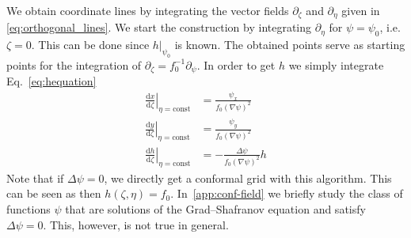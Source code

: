 \documentclass{hitec} %
\renewcommand{\d}{\mathrm{d}}
\begin{document}
We obtain coordinate lines by integrating the vector fields $\partial_\zeta$ and $\partial_\eta$ given in \eqref{eq:orthogonal_lines}. We start the construction by integrating $\partial_\eta$ for $\psi = \psi_0$, i.e. $\zeta=0$. This can be done since $h|_{\psi_0}$ is known. 
The obtained points serve as starting points for the integration of $\partial_\zeta = f_0^{-1} \partial_\psi$.
In order to get $h$ we simply integrate Eq.~\eqref{eq:hequation}
\begin{subequations}
\begin{align}
    \left .\frac{\d x}{\d \zeta}\right |_{\eta=\text{const}} &= \frac{\psi_x}{f_0(\nabla\psi)^2}\\
    \left .\frac{\d y}{\d \zeta}\right|_{\eta=\text{const}} &= \frac{\psi_y}{f_0(\nabla\psi)^2}\\
    \left .\frac{\d h}{\d \zeta}\right|_{\eta=\text{const}} &= - \frac{\Delta \psi}{f_0(\nabla\psi)^2} h%
\end{align}
  \label{eq:etacoordinates}
\end{subequations}
Note that if $\Delta\psi=0$, we directly get a conformal grid with this algorithm. This can be seen as then $h(\zeta,\eta) = f_0$. In~\ref{app:conf-field}
we briefly study the class of functions $\psi$ that are solutions of the Grad--Shafranov equation and satisfy $\Delta \psi=0$. This, however, is not true in general.
\end{document}
